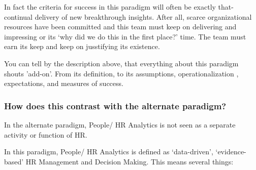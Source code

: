 \documentclass[12pt,letterpaper]{article}
\begin{document}
In fact the criteria for success in this paradigm will often be exactly
that- continual delivery of new breakthrough insights. After all, scarce
organizational resources have been committed and this team must keep on
delivering and impressing or its `why did we do this in the first
place?' time. The team must earn its keep and keep on jusstifying its
existence.

You can tell by the description above, that everything about this
paradigm shouts 'add-on'. From its definition, to its assumptions,
operationalization , expectations, and measures of success.

\subsubsection{How does this contrast with the alternate paradigm?}

In the alternate paradigm, People/ HR Analytics is not seen as a
separate activity or function of HR.

In this paradigm, People/ HR Analytics is defined as `data-driven',
`evidence-based' HR Management and Decision Making. This means several
things:
\end{document}
